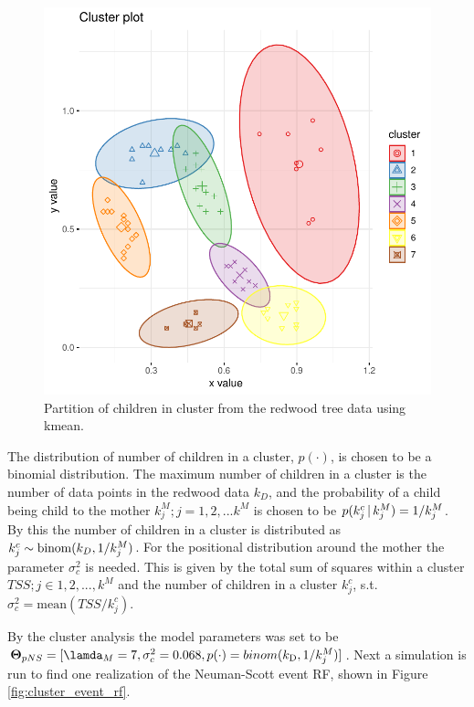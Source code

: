\begin{figure}
    \centering
    \includegraphics[scale=0.95]{figures/redwood_cluster_partitioning.pdf}
    \caption{Partition of children in cluster from the redwood tree data using kmean.}
    \label{fig:cluster_part}
\end{figure}

The distribution of number of children in a cluster, $p(\cdot)$, is chosen to be a binomial distribution. The maximum number of children in a cluster is the number of data points in the redwood data $k_D$, and the probability of a child being child to the mother $k_j^M;j=1,2,...k^M$ is chosen to be $p(k_j^c \, | \, k_j^M) = 1/k_j^M$. By this the number of children in a cluster is distributed as $k_j^c \sim \mathrm{binom}(k_D,1/k_j^M)$. For the positional distribution around the mother the parameter $\sigma_c^2$ is needed. This is given by the total sum of squares within a cluster $TSS; j\in 1,2,...,k^M$ and the number of children in a cluster $k_j^c$, s.t. $\sigma_c^2 = \mathrm{mean}(TSS/k_j^c)$.

By the cluster analysis the model parameters was set to be $\vect{\Theta}_{pNS} = [\lamda_M = 7, \sigma_c^2 = 0.068, p(\cdot) = binom(k_\textrm{D},1/k_j^M)]$. Next a simulation is run to find one realization of the Neuman-Scott event RF, shown in Figure \ref{fig:cluster_event_rf}.

